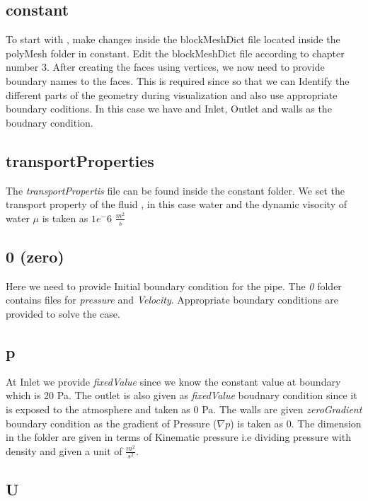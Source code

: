 \subsection{constant}
To start with , make changes inside the blockMeshDict file located inside the polyMesh folder in constant. Edit the blockMeshDict file according to chapter number 3. 
After creating the faces using vertices, we now need to provide boundary names to the faces. This is required since so that we can Identify the different parts of the geometry during visualization and also use appropriate boundary coditions. In this case we have and Inlet, Outlet and walls as the boudnary condition. 

\subsection*{transportProperties}

The \textit{transportPropertis} file can be found inside the constant folder. We set the transport property of the fluid , in this case water and the dynamic visocity of water $\mu$ is taken as $1e^-6$ $\frac{m^2}{s}$
 
\subsection{0 (zero)}
Here we need to provide Initial boundary condition for the pipe. The \textit{0} folder contains files for \textit{pressure} and \textit{Velocity}. Appropriate boundary conditions are provided to solve the case.

\subsection*{p}

At Inlet we provide \textit{fixedValue} since we know the constant value at boundary which is 20 Pa. \newline
\flushleft The outlet is also given as \textit{fixedValue} boudnary condition since it is exposed to the atmosphere and taken as 0 Pa.\newline 
\flushleft The walls are given \textit{zeroGradient} boundary condition as the gradient of Pressure ($\nabla p$) is taken as 0. \newline
The dimension in the folder are given in terms of Kinematic pressure i.e dividing pressure with density and given a unit of $\frac{m^2}{s^2}$.

\subsection*{U}

